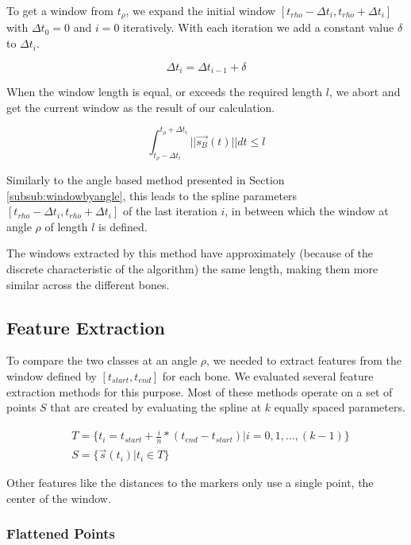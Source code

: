 \documentclass[pdftex,12pt,a4paper]{report}
\begin{document}
To get a window from $t_\rho$, we expand the initial window $[t_{rho}-\Delta t_i,
t_{rho}+\Delta t_i]$ with $\Delta t_0 = 0$ and $i=0$ iteratively. With each iteration we add a constant value $\delta$ to $\Delta t_i$.

\begin{equation}
\Delta t_i = \Delta t_{i-1} + \delta
\end{equation}

When the window length is equal, or exceeds the required length $l$, we abort and get the current
window as the result of our calculation.

\begin{equation}
\int_{t_\rho - \Delta t_i}^{t_\rho + \Delta t_i} ||\vec{s_B}(t)|| dt \leq l
\end{equation}

Similarly to the angle based method presented in Section \ref{subsub:windowbyangle}, this leads to the spline parameters $[t_{rho}-\Delta t_i, t_{rho}+\Delta t_i]$ of the last iteration $i$, in between which the window at angle $\rho$ of length $l$ is defined.

The windows extracted by this method have approximately (because of the discrete
characteristic of the algorithm) the same length, making them more similar across
the different bones.

\subsection{Feature Extraction}
\label{sub:featureextraction}

To compare the two classes at an angle $\rho$, we needed to extract features from the
window defined by $[t_{start}, t_{end}]$ for each bone. We evaluated several feature
extraction methods for this purpose. Most of these methods operate on a set of points
$S$ that are created by evaluating the spline at $k$ equally spaced parameters.

\begin{equation}
\begin{split}
& T = \{ t_i=t_{start} + \frac{i}{n} * (t_{end}-t_{start}) | i=0, 1, \dots, (k-1) \} \\
& S = \{ \vec{s}(t_i) | t_i \in T \}
\end{split}
\end{equation}  

Other features like the distances to the markers only use a single point, the center of
the window.

\subsubsection{Flattened Points}
\end{document}

